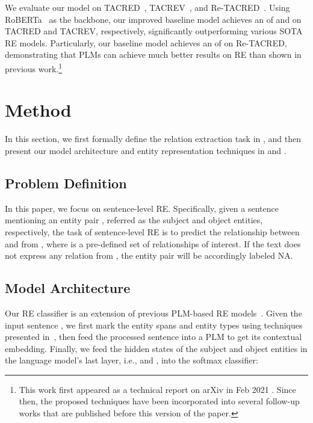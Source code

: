 \documentclass[11pt,a4paper]{article}
\begin{document}
We evaluate our model on TACRED~\cite{zhang-etal-2017-position}, TACREV~\cite{alt-etal-2020-tacred}, and Re-TACRED~\cite{stoica2021re}.
Using RoBERTa~\cite{liu2019roberta} as the backbone, our improved baseline model achieves an  of  and  on TACRED and TACREV, respectively, significantly outperforming various SOTA RE models.
Particularly, our baseline model achieves an  of  on Re-TACRED, demonstrating that PLMs can achieve much better results on RE than shown in previous work.\footnote{This work first appeared as a technical report on arXiv in Feb 2021 \cite{zhou2021improved}.
Since then, the proposed techniques have been incorporated into several follow-up works \cite{chen2022knowprompt,wang-etal-2022-rely,wang-etal-2022-graphcache,lu2022summarization,han2021ptr,kulkarni-etal-2022-learning} that are published before this version of the paper.
}


\section{Method}

In this section, we first formally define the relation extraction task in , and then present our model architecture and entity representation techniques in  and .

\subsection{Problem Definition}
\label{sec:task_definition}
In this paper, we focus on sentence-level RE.
Specifically, given a sentence  mentioning an entity pair , referred as the subject and object entities, respectively, the task of sentence-level RE is to predict the relationship  between  and  from , where  is a pre-defined set of relationships of interest.
If the text does not express any relation from , the entity pair will be accordingly labeled \textsc{NA}.

\subsection{Model Architecture}
\label{sec:model_architecture}
Our RE classifier is an extension of previous PLM-based RE models~\cite{baldini-soares-etal-2019-matching}.
Given the input sentence , we first mark the entity spans and entity types using techniques presented in~, then feed the processed sentence into a PLM to get its contextual embedding.
Finally, we feed the hidden states of the subject and object entities in the language model's last layer, i.e.,  and , into the softmax classifier:
\end{document}
